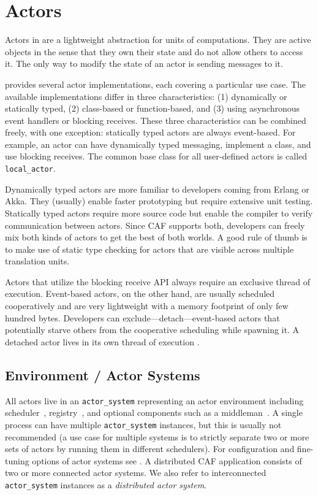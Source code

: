 \section{Actors}
\label{actor}

Actors in \lib are a lightweight abstraction for units of computations. They are active objects in the sense that they own their state and do not allow others to access it. The only way to modify the state of an actor is sending messages to it.

\lib provides several actor implementations, each covering a particular use case.
The available implementations differ in three characteristics: (1) dynamically or statically typed, (2) class-based or function-based, and (3) using asynchronous event handlers or blocking receives.
These three characteristics can be combined freely, with one exception: statically typed actors are always event-based.
For example, an actor can have dynamically typed messaging, implement a class, and use blocking receives.
The common base class for all user-defined actors is called \lstinline^local_actor^.

Dynamically typed actors are more familiar to developers coming from Erlang or Akka.
They (usually) enable faster prototyping but require extensive unit testing.
Statically typed actors require more source code but enable the compiler to verify communication between actors.
Since CAF supports both, developers can freely mix both kinds of actors to get the best of both worlds.
A good rule of thumb is to make use of static type checking for actors that are visible across multiple translation units.

Actors that utilize the blocking receive API always require an exclusive thread of execution. Event-based actors, on the other hand, are usually scheduled cooperatively and are very lightweight with a memory footprint of only few hundred bytes. Developers can exclude---detach---event-based actors that potentially starve others from the cooperative scheduling while spawning it. A detached actor lives in its own thread of execution .

\subsection{Environment / Actor Systems}
\label{actor-system}

All actors live in an \lstinline^actor_system^ representing an actor environment including scheduler~, registry~, and optional components such as a middleman~. A single process can have multiple \lstinline^actor_system^ instances, but this is usually not recommended (a use case for multiple systems is to strictly separate two or more sets of actors by running them in different schedulers). For configuration and fine-tuning options of actor systems see . A distributed CAF application consists of two or more connected actor systems. We also refer to interconnected \lstinline^actor_system^ instances as a \emph{distributed actor system}.

